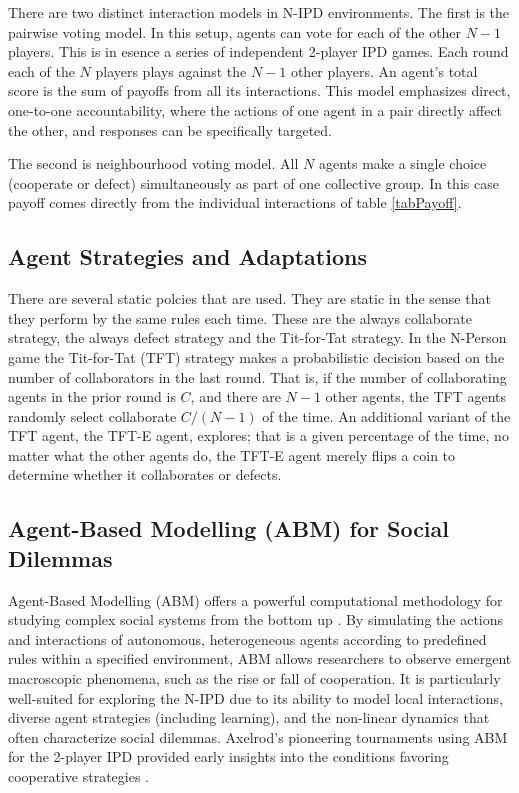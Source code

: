 \documentclass[]{llncs} %
\begin{document}
There are  two distinct interaction models in N-IPD environments.
The first is the pairwise voting model. In this setup, agents can
vote for each of the other $N-1$ players.  This is in esence a series of
independent 2-player IPD games. Each round each of the $N$ players plays
against the $N-1$ other players. An
agent's total score is the sum of payoffs from all its interactions. This
model emphasizes direct, one-to-one accountability,
where the actions of one agent in a pair directly affect the other,
and responses can be specifically targeted.

The second is neighbourhood voting model.  All $N$ agents make a
single choice (cooperate or defect) simultaneously as part of one
collective group. In this case payoff comes directly from the individual
interactions of table \ref {tabPayoff}.

\subsection{Agent Strategies and Adaptations}

There are several static polcies that are used.  They are static in
the sense that they perform by the same rules each time.  These are
the always collaborate strategy, the always defect strategy and the
Tit-for-Tat strategy.  In the N-Person game the Tit-for-Tat (TFT)
strategy makes a probabilistic decision based on the number of
collaborators in the last round.  That is, if the number of
collaborating agents in the prior round is $C$, and there are $N-1$
other agents, the TFT agents randomly select collaborate $C/(N-1)$ of
the time.  An additional variant of the TFT agent, the TFT-E agent,
explores; that is a given percentage of the time, no matter what the
other agents do, the TFT-E agent merely flips a coin to determine whether
it collaborates or defects.

\subsection{Agent-Based Modelling (ABM) for Social Dilemmas}
Agent-Based Modelling (ABM) offers a powerful computational
methodology for studying complex social systems from the bottom up
\cite{Gilbert2007, Macal2010}. By simulating the actions and
interactions of autonomous, heterogeneous agents according to
predefined rules within a specified environment, ABM allows
researchers to observe emergent macroscopic phenomena, such as the
rise or fall of cooperation. It is particularly well-suited for
exploring the N-IPD due to its ability to model local interactions,
diverse agent strategies (including learning), and the non-linear
dynamics that often characterize social dilemmas. Axelrod's pioneering
tournaments using ABM for the 2-player IPD provided early insights
into the conditions favoring cooperative strategies \cite{Axelrod}.
\end{document}
